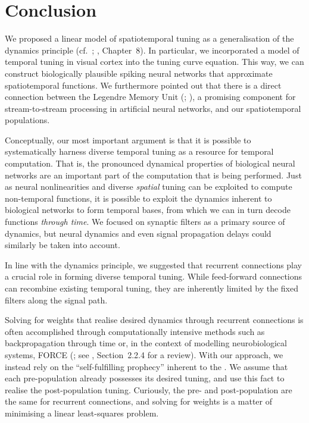 
\section{Conclusion}
\label{sec:temporal_tuning_conclusion}

We proposed a linear model of spatiotemporal tuning as a generalisation of the \NEF dynamics principle (cf.~; \cite{eliasmith2003neural}, Chapter~8).
In particular, we incorporated a model of temporal tuning in visual cortex \citep[cf.][]{carandini1999linearity} into the \NEF tuning curve equation.
This way, we can construct biologically plausible spiking neural networks that approximate spatiotemporal functions.
We furthermore pointed out that there is a direct connection between the Legendre Memory Unit (\LMU; \cite{voelker2019lmu}), a promising component for stream-to-stream processing in artificial neural networks, and our spatiotemporal \NEF populations.

Conceptually, our most important argument is that it is possible to systematically harness diverse temporal tuning as a resource for temporal computation.
That is, the pronounced dynamical properties of biological neural networks are an important part of the computation that is being performed.
Just as neural nonlinearities and diverse \emph{spatial} tuning can be exploited to compute non-temporal functions, it is possible to exploit the dynamics inherent to biological networks to form temporal bases, from which we can in turn decode functions \emph{through time}.
We focused on synaptic filters as a primary source of dynamics, but neural dynamics and even signal propagation delays could similarly be taken into account.

In line with the \NEF dynamics principle, we suggested that recurrent connections play a crucial role in forming diverse temporal tuning.
While feed-forward connections can recombine existing temporal tuning, they are inherently limited by the fixed filters along the signal path.

Solving for weights that realise desired dynamics through recurrent connections is often accomplished through computationally intensive methods such as backpropagation through time \citep{werbos1990backpropagation} or, in the context of modelling neurobiological systems, FORCE (\cite{sussillo2009generating,nicola2017supervised}; see \cite{voelker2019}, Section~2.2.4 for a review).
With our approach, we instead rely on the \enquote{self-fulfilling prophecy} inherent to the \NEF.
We assume that each pre-population already possesses its desired tuning, and use this fact to realise the post-population tuning.
Curiously, the pre- and post-population are the same for recurrent connections, and solving for weights is a matter of minimising a linear least-squares problem.

